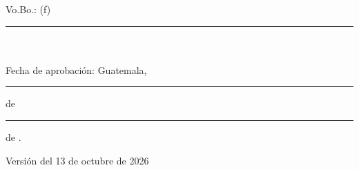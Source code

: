 \par\vspace*{2em}
\noindent Vo.Bo.: (f) \rule[1pt]{3.5 in}{1pt}\\
\nombreasesor\\[1em]
Fecha de aprobación: Guatemala, \rule[1pt]{0.5 in}{1pt} de \rule[1pt]{1 in}{1pt} de \anoaprobacion.

\par\vspace{1em}
\footnotesize Versión del 13 de octubre de 2026\normalsize
